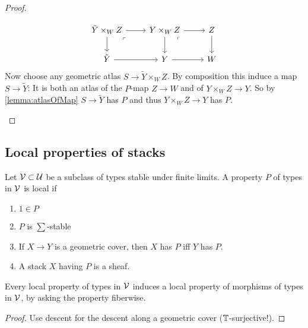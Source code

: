 \begin{proof}
\begin{enumerate}
		\[\begin{tikzcd}
			{\tilde Y \times_W Z} & {Y \times_W Z} & Z \\
			{\tilde Y} & Y & W
			\arrow[from=1-1, to=1-2]
			\arrow[from=1-1, to=2-1]
			\arrow["\ulcorner"{anchor=center, pos=0.125}, draw=none, from=1-1, to=2-2]
			\arrow[from=1-2, to=1-3]
			\arrow[from=1-2, to=2-2]
			\arrow["\ulcorner"{anchor=center, pos=0.125}, draw=none, from=1-2, to=2-3]
			\arrow[from=1-3, to=2-3]
			\arrow[from=2-1, to=2-2]
			\arrow[from=2-2, to=2-3]
		\end{tikzcd}\]
		Now choose any geometric atlas $S \to \tilde Y \times_W Z$. By composition this induce a map $S \to \tilde Y$: 
		It is both an atlas of the $P$-map $Z \to W$ and of $ Y\times_W Z \to Y$. So by \ref{lemma:atlasOfMap} $S \to \tilde Y$ has $P$ and thus $Y \times_W Z \to Y$ has $P$. 
		
	\end{enumerate}
\end{proof}
\subsection{Local properties of stacks}
\begin{definition}
	Let $\mathcal{V} \subset \mathcal{U}$ be a subclass of types stable under finite limits. A property $P$ of types in $\mathcal{V}$ is local if 
	\begin{enumerate}
		\item $1 \in P$
		\item $P$ is $\sum$-stable
		\item If $X \to Y$ is a geometric cover, then $X$ has $P$ iff $Y$ has $P$.
		\item A stack $X$ having $P$ is a sheaf.
	\end{enumerate}
\end{definition}
\begin{lemma}
	Every local property of types in $\mathcal{V}$ induces a local property of morphisms of types in $\mathcal{V}$, by asking the property fiberwise.
\end{lemma}
\begin{proof}
	Use descent for the descent along a geometric cover ($\mathbb{T}$-surjective!).
\end{proof}
